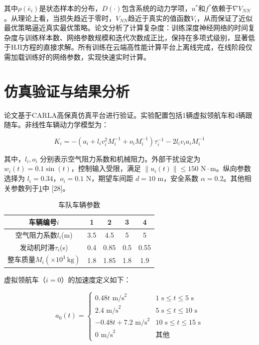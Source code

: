 \documentclass[10.5pt,a4paper,twoside,twocolumn]{ctexart}
\begin{document}
其中$\rho(\bar{e}_i)$是状态样本的分布，$D(\cdot)$包含系统的动力学项，$u^*$和$f^*$依赖于$\nabla V_{NN}$。从理论上看，当损失趋近于零时，$V_{NN}$趋近于真实的值函数$V_i$，从而保证了近似最优策略逼近真实最优策略。论文分析了计算复杂度：训练深度神经网络的时间复杂度与训练样本数、网络参数规模和迭代次数成正比，保持在多项式级别，显著低于HJI方程的直接求解。所有训练在云端高性能计算平台上离线完成，在线阶段仅需加载训练好的网络参数，实现快速实时计算。

\section{\heiti{} 仿真验证与结果分析}

论文基于CARLA高保真仿真平台进行验证。实验配置包括1辆虚拟领航车和4辆跟随车。非线性车辆动力学模型为：

\begin{equation}
K_i = -(a_i + l_i v_i^2 M_i^{-1} + o_i M_i^{-1})\tau_i^{-1} - 2l_i v_i a_i M_i^{-1} 
\end{equation}

其中，$l_i, o_i$ 分别表示空气阻力系数和机械阻力。外部干扰设定为 $w_i(t)= 0.1 \sin(t)$，控制输入受限，满足 $\|u_i(t)\| \le 150 \text{ N}\cdot\text{m}$。纵向参数选择为 $l_i= 0.34$，$o_i= 0.1 \text{ N}$，期望车间距 $d= 10 \text{ m}$，安全系数 $\alpha= 0.2$。其他相关参数列于\ref{tab:car}中 [28]。

\begin{table}[htbp]
	\centering
	\caption{车队车辆参数}
	\label{tab:car}
	\begin{tabular}{|c|c|c|c|c|}
		\hline
		车辆编号$i$ & 1 & 2 & 3 & 4 \\
		\hline
		空气阻力系数\(l_i\)(m) & 3.5 & 4.5 & 5 & 5 \\
		发动机时滞\(\tau_i\)(s) & 0.4 & 0.85 & 0.5 & 0.55 \\
		整车质量\(M_i(\times10^3\ \text{kg})\) & 1.8 & 1.85 & 1.8 & 1.9 \\
		\hline
	\end{tabular}
\end{table}

虚拟领航车（$i=0$）的加速度定义如下：

\begin{equation}
a_0(t)= 
\begin{cases} 
	0.48t \text{ m/s}^2 & 1 \text{ s} \le t \le 5 \text{ s} \\ 
	2.4 \text{ m/s}^2 & 5 \text{ s} \le t \le 10 \text{ s} \\ 
	-0.48t+ 7.2 \text{ m/s}^2 & 10 \text{ s} \le t \le 15 \text{ s} \\ 
	0 \text{ m/s}^2 & \text{其他} 
\end{cases}
\end{equation}
\end{document}
